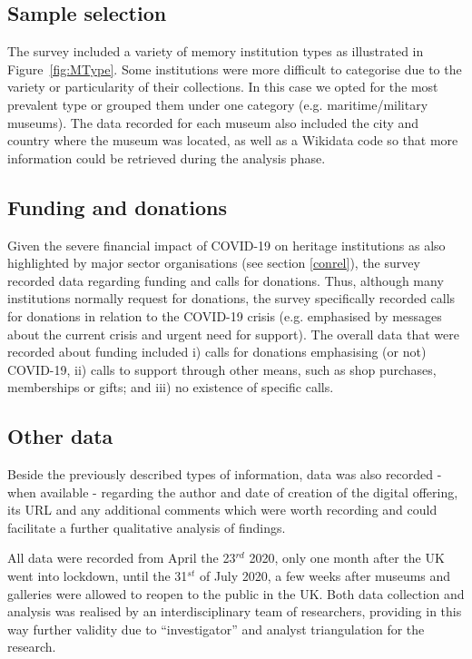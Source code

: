 \documentclass{egpubl}
\begin{document}
\subsection{Sample selection}
The survey included a variety of memory institution types as illustrated in Figure~\ref{fig:MType}. Some institutions were more difficult to categorise due to the variety or particularity of their collections. In this case we opted for the most prevalent type or grouped them under one category (e.g. maritime/military museums). The data recorded for each museum also included the city and country where the museum was located, as well as a Wikidata code so that more information could be retrieved during the analysis phase.

\subsection{Funding and donations}
\label{fund}
Given the severe financial impact of COVID-19 on heritage institutions as also highlighted by major sector organisations (see section \ref{conrel}), the survey recorded data regarding funding and calls for donations. Thus, although many institutions normally request for donations, the survey specifically recorded calls for donations in relation to the COVID-19 crisis (e.g. emphasised by messages about the current crisis and urgent need for support). The overall data that were recorded about funding included i) calls for donations emphasising (or not)  COVID-19, ii) calls to support through other means, such as shop purchases, memberships or gifts; and iii) no existence of specific calls.

\subsection{Other data}
\label{other}

Beside the previously described types of information, data was also recorded - when available - regarding the author and date of creation of the digital offering, its URL and any additional comments which were worth recording and could facilitate a further qualitative analysis of findings.

All data were recorded from April the 23$^{rd}$  2020, only one month after the UK went into lockdown, until the 31$^{st}$ of July 2020, a few weeks after museums and galleries were allowed to reopen to the public in the UK. Both data collection and analysis was realised by an interdisciplinary team of researchers, providing in this way further validity due to ``investigator'' and analyst triangulation for the research.
\end{document}
